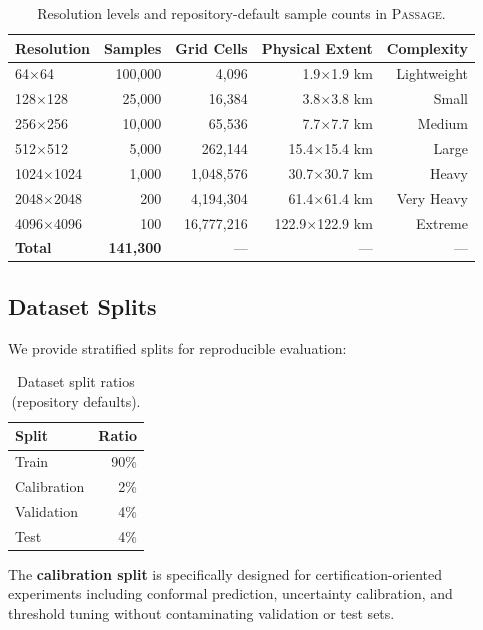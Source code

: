 \documentclass{article}
\newcommand{\dataset}{\textsc{Passage}}
\begin{document}
\begin{table}[h]
\centering
\caption{Resolution levels and repository-default sample counts in \dataset{}.}
\label{tab:resolutions}
\begin{tabular}{lrrrr}
\toprule
Resolution & Samples & Grid Cells & Physical Extent & Complexity \\
\midrule
64$\times$64     & 100,000 & 4,096       & 1.9$\times$1.9 km & Lightweight \\
128$\times$128   & 25,000  & 16,384      & 3.8$\times$3.8 km & Small \\
256$\times$256   & 10,000  & 65,536      & 7.7$\times$7.7 km & Medium \\
512$\times$512   & 5,000   & 262,144     & 15.4$\times$15.4 km & Large \\
1024$\times$1024 & 1,000   & 1,048,576   & 30.7$\times$30.7 km & Heavy \\
2048$\times$2048 & 200     & 4,194,304   & 61.4$\times$61.4 km & Very Heavy \\
4096$\times$4096 & 100     & 16,777,216  & 122.9$\times$122.9 km & Extreme \\
\midrule
\textbf{Total}   & \textbf{141,300} & --- & --- & --- \\
\bottomrule
\end{tabular}
\end{table}

\subsection{Dataset Splits}

We provide stratified splits for reproducible evaluation:

\begin{table}[h]
\centering
\caption{Dataset split ratios (repository defaults).}
\label{tab:splits}
\begin{tabular}{lr}
\toprule
Split & Ratio \\
\midrule
Train & 90\% \\
Calibration & 2\% \\
Validation & 4\% \\
Test & 4\% \\
\bottomrule
\end{tabular}
\end{table}

The \textbf{calibration split} is specifically designed for certification-oriented experiments including conformal prediction, uncertainty calibration, and threshold tuning without contaminating validation or test sets.
\end{document}
